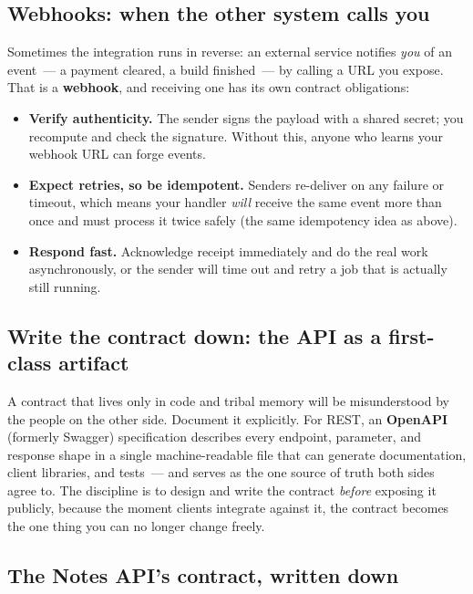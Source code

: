 \subsection*{Webhooks: when the other system calls you}\label{34-response-handling:webhooks-when-the-other-system-calls-you}

Sometimes the integration runs in reverse: an external service notifies \emph{you} of an event~--- a payment cleared, a build finished~--- by calling a URL you expose. That is a \textbf{webhook}, and receiving one has its own contract obligations:

\begin{itemize}
\tightlist
\item
  \textbf{Verify authenticity.} The sender signs the payload with a shared secret; you recompute and check the signature. Without this, anyone who learns your webhook URL can forge events.
\item
  \textbf{Expect retries, so be idempotent.} Senders re-deliver on any failure or timeout, which means your handler \emph{will} receive the same event more than once and must process it twice safely (the same idempotency idea as above).
\item
  \textbf{Respond fast.} Acknowledge receipt immediately and do the real work asynchronously, or the sender will time out and retry a job that is actually still running.
\end{itemize}

\subsection*{Write the contract down: the API as a first-class artifact}\label{34-response-handling:write-the-contract-down-the-api-as-a-first-class-artifact}

A contract that lives only in code and tribal memory will be misunderstood by the people on the other side. Document it explicitly. For REST, an \textbf{OpenAPI} (formerly Swagger) specification describes every endpoint, parameter, and response shape in a single machine-readable file that can generate documentation, client libraries, and tests~--- and serves as the one source of truth both sides agree to. The discipline is to design and write the contract \emph{before} exposing it publicly, because the moment clients integrate against it, the contract becomes the one thing you can no longer change freely.

\subsection*{The Notes API's contract, written down}\label{34-response-handling:the-notes-apis-contract-written-down}

